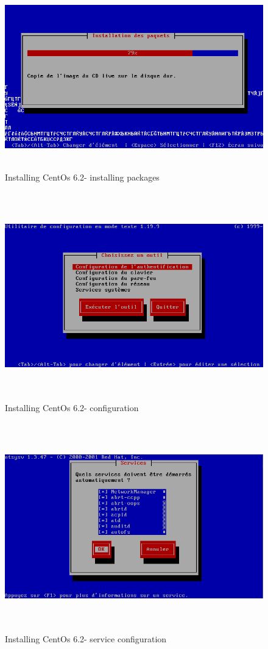 \begin{figure}[!h]
 \center
 \includegraphics[width=13cm, height=8cm]{./images/install/install}
 \caption{Installing CentOs 6.2- installing packages}
\end{figure}

\newpage

\begin{figure}[!h]
 \center
 \includegraphics[width=13cm, height=9cm]{./images/install/conf}
 \caption{Installing CentOs 6.2- configuration}
\end{figure}

\begin{figure}[!h]
 \center
 \includegraphics[width=13cm, height=9cm]{./images/install/service}
 \caption{Installing CentOs 6.2- service configuration}
\end{figure}



